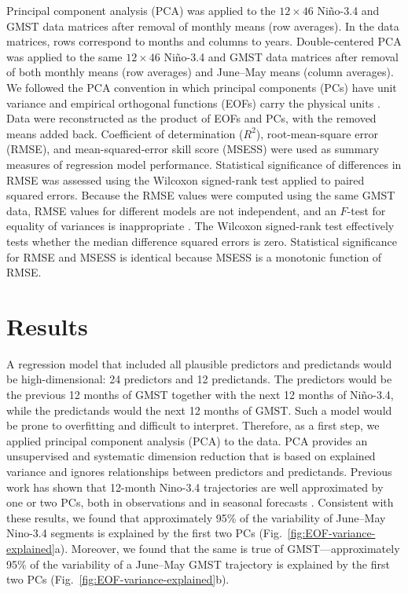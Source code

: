 \documentclass[draft]{agujournal2019}
\begin{document}
Principal component analysis (PCA) was applied to the
    $12 \times 46$ Niño-3.4 and GMST data matrices after removal of
    monthly means (row averages). In the data matrices, rows
    correspond to months and columns to years. Double-centered PCA was applied to the same $12 \times 46$
    Niño-3.4 and GMST data matrices after removal of both monthly
    means (row averages) and June--May means (column averages). We followed the PCA convention in which principal components
    (PCs) have unit variance and empirical orthogonal functions (EOFs)
    carry the physical units \cite{DelsoleTippettBook}. Data were reconstructed as the product of EOFs and PCs, with
  the removed means added back. Coefficient of determination ($R^2$), root-mean-square error
  (RMSE), and mean-squared-error skill score (MSESS) were used as
  summary measures of regression model performance. Statistical significance of differences in RMSE was assessed
    using the Wilcoxon signed-rank test applied to paired squared
    errors. Because the RMSE values were computed using the same GMST
    data, RMSE values for different models are not independent, and an
    $F$-test for equality of variances is inappropriate
    \cite{TDS:Comparing:2014}. The Wilcoxon signed-rank test
    effectively tests whether the median difference squared errors is
    zero. Statistical significance for RMSE and MSESS is identical
    because MSESS is a monotonic function of RMSE.

\section{Results}\label{sec:results}

A regression model that included all plausible predictors and
    predictands would be high-dimensional: 24 predictors and 12
    predictands. The predictors would be the previous 12 months of
    GMST together with the next 12 months of Niño-3.4, while the
    predictands would the next 12 months of GMST. Such a model would
    be prone to overfitting and difficult to interpret. Therefore, as
    a first step, we applied principal component analysis (PCA) to the
    data. PCA provides an unsupervised and systematic dimension
    reduction that is based on explained variance and ignores
    relationships between predictors and predictands. Previous work has shown that 12-month Nino-3.4 trajectories
    are well approximated by one or two PCs, both in observations and
    in seasonal forecasts \cite{Bunge2009verified,Tippett2019:ENSO}.
    Consistent with these results, we found that approximately 95\% of
    the variability of June--May Nino-3.4 segments is explained by the
    first two PCs (Fig.\ \ref{fig:EOF-variance-explained}a). Moreover, we found that the same is true of
    GMST---approximately 95\% of the variability of a June--May GMST
    trajectory is explained by the first two PCs (Fig.\
    \ref{fig:EOF-variance-explained}b).
\end{document}
